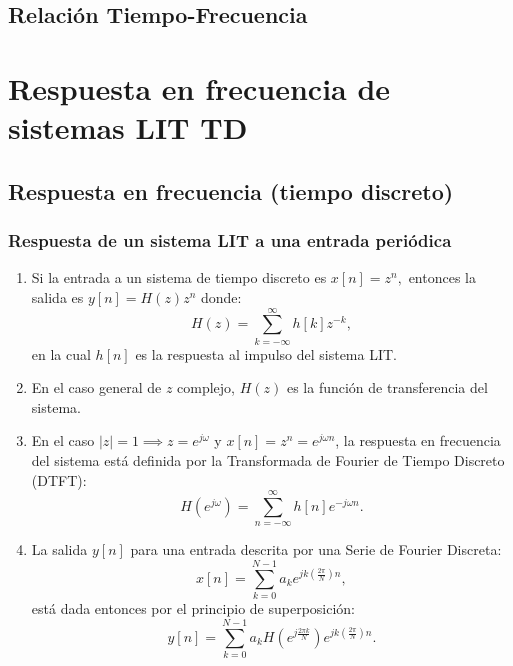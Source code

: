 \documentclass[11pt,a4paper,openany]{book}
\begin{document}
\section{Relación Tiempo-Frecuencia}


\chapter{Respuesta en frecuencia de sistemas LIT TD}

\section{Respuesta en frecuencia (tiempo discreto)}

\subsection{Respuesta de un sistema LIT a una entrada peri\'{o}dica}

\begin{enumerate}
	
	\item Si la entrada a un sistema de tiempo discreto es $x[n] = z^n,$ entonces la salida es $y[n] = H(z) z^n$ donde:
	\begin{equation}
		H(z) = \sum_{k=-\infty}^{\infty} h[k] z^{-k},
	\end{equation}
	en la cual $h[n]$ es la respuesta al impulso del sistema LIT.
	
	\item En el caso general de $z$ complejo, $H(z)$ es la funci\'{o}n de transferencia del sistema.
	
	\item En el caso $|z| = 1 \implies z = e^{j\omega}$ y $x[n] = z^n = e^{j\omega n}$, la respuesta en frecuencia del sistema est\'{a} definida por la Transformada de Fourier de Tiempo Discreto (DTFT):
	\begin{equation}
		H(e^{j\omega}) = \sum_{n=-\infty}^{\infty} h[n] e^{-j\omega n}.
	\end{equation}
	
	\item La salida $y[n]$ para una entrada descrita por una Serie de Fourier Discreta:
	\begin{equation}
		x[n] = \sum_{k=0}^{N-1} a_{k} e^{jk\left( \frac{2\pi}{N} \right) n},
	\end{equation}
	est\'{a} dada entonces por el principio de superposición:
	\begin{equation}
		y[n] = \sum_{k=0}^{N-1} a_{k} H\left( e^{j \frac{2\pi k}{N}} \right) e^{jk\left( \frac{2\pi}{N} \right) n}.
	\end{equation}
	
\end{enumerate}
\end{document}
